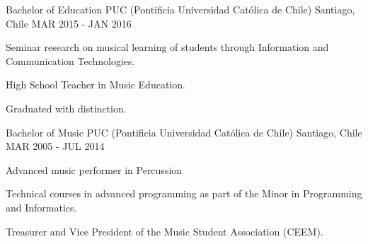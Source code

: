 

\begin{cventries}

  \cventry
    {Bachelor of Education} %
    {PUC (Pontificia Universidad Católica de Chile)} %
    {Santiago, Chile} %
    {MAR 2015 - JAN 2016} %
    {
      \begin{cvitems} %
        \item {Seminar research on musical learning of students through Information and Communication Technologies.}
        \item {High School Teacher in Music Education.}
        \item {Graduated with distinction.}
      \end{cvitems}
    }

  \cventry
    {Bachelor of Music} %
    {PUC (Pontificia Universidad Católica de Chile)} %
    {Santiago, Chile} %
    {MAR 2005 - JUL 2014} %
    {
	    \begin{cvitems} %
	     	\item {Advanced music performer in Percussion}
	     	\item {Technical courses in advanced programming as part of the Minor in Programming and Informatics.}
	     	\item {Treasurer and Vice President of the Music Student Association (CEEM).}
	    \end{cvitems}
    }

\end{cventries}
